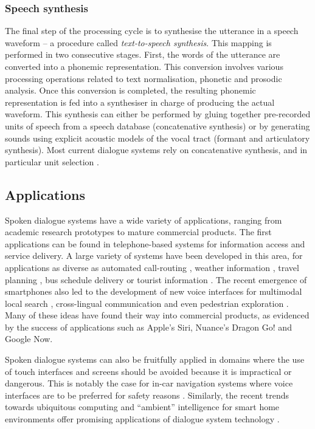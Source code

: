 \subsubsection*{Speech synthesis}
The final step of the processing cycle is to synthesise the utterance in a speech waveform --  a procedure called \textit{text-to-speech synthesis}.  This mapping is performed in two consecutive stages.  First, the words of the utterance are converted into a phonemic representation. This conversion involves various processing operations related to text normalisation, phonetic and prosodic analysis.  Once this conversion is completed, the resulting phonemic representation is fed into a synthesiser in charge of producing the actual waveform. This synthesis can either be performed by gluing together pre-recorded units of speech from a speech database (concatenative synthesis) or by generating sounds using explicit acoustic models of the vocal tract (formant and articulatory synthesis). Most current dialogue systems rely on concatenative synthesis, and in particular unit selection \citep{hunt1996}. 

\subsection{Applications}

Spoken dialogue systems have a wide variety of applications, ranging from academic research prototypes to mature commercial products. The first applications can be found in telephone-based systems for information access and service delivery.  A large variety of systems have been developed in this area, for applications as diverse as automated call-routing \citep{GorinRW97}, weather information \citep{jupiter}, travel planning \citep{walker2001}, bus schedule delivery \citep{RauxLBBE05} or tourist information \citep{lemon2006}.  The recent emergence of smartphones also led to the development of new voice interfaces for multimodal local search \citep{EhlenJ13}, cross-lingual communication \citep{yochina} and even pedestrian exploration  \citep{janarthanam2012integrating}.  Many of these ideas have found their way into commercial products, as evidenced by the success of applications such as Apple's Siri, Nuance's Dragon Go! and Google Now. 

Spoken dialogue systems can also be fruitfully applied in domains where the use of touch interfaces and screens should be avoided because it is impractical or dangerous.  This is notably the case for in-car navigation systems where voice interfaces are to be preferred for safety reasons \citep{cumove,CastronovoMPM10}.  Similarly, the recent trends towards ubiquitous computing and ``ambient'' intelligence for smart home environments offer promising applications of dialogue system technology \citep{vipperla2009a,ambient2010}.

